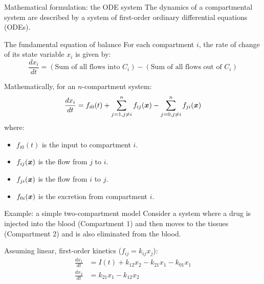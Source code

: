 \documentclass[aspectratio=169]{beamer}\usepackage[]{graphicx}\usepackage[]{xcolor}
\begin{document}
\begin{frame}{Mathematical formulation: the ODE system}
    The dynamics of a compartmental system are described by a system of first-order ordinary differential equations (ODEs).

    \begin{block}{The fundamental equation of balance}
        For each compartment $i$, the rate of change of its state variable $x_i$ is given by:
        $$ \frac{dx_i}{dt} = (\text{Sum of all flows into } C_i) - (\text{Sum of all flows out of } C_i) $$
    \end{block}

    Mathematically, for an $n$-compartment system:
    $$ \frac{dx_i}{dt} = f_{i0}(t) + \sum_{j=1, j\neq i}^{n} f_{ij}(\bm{x}) - \sum_{j=0, j\neq i}^{n} f_{ji}(\bm{x}) $$
    where:
    \begin{itemize}
        \item $f_{i0}(t)$ is the input to compartment $i$.
        \item $f_{ij}(\bm{x})$ is the flow from $j$ to $i$.
        \item $f_{ji}(\bm{x})$ is the flow from $i$ to $j$.
        \item $f_{0i}(\bm{x})$ is the excretion from compartment $i$.
    \end{itemize}
\end{frame}

\begin{frame}{Example: a simple two-compartment model}
    Consider a system where a drug is injected into the blood (Compartment 1) and then moves to the tissues (Compartment 2) and is also eliminated from the blood.

    \begin{center}
    \end{center}

    Assuming linear, first-order kinetics ($f_{ij} = k_{ij}x_j$):
    \begin{align*}
        \frac{dx_1}{dt} &= I(t) + k_{12}x_2 - k_{21}x_1 - k_{01}x_1 \\
        \frac{dx_2}{dt} &= k_{21}x_1 - k_{12}x_2
    \end{align*}
\end{frame}
\end{document}

